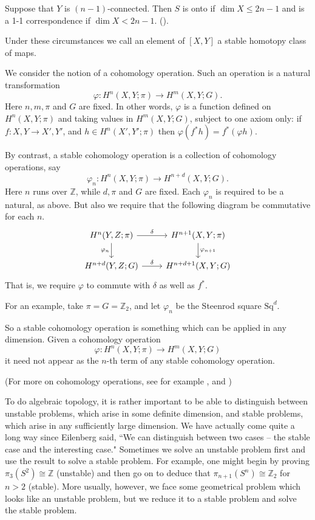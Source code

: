 \documentclass[../main]{subfiles}
\begin{document}
\begin{theorem}
    Suppose that $Y$ is $(n-1)$-connected. Then $S$ is onto if $\dim X \le 2n - 1$ and is a 1-1 correspondence if $\dim X < 2n - 1$. (\cite[p.~458]{spanier}).
\end{theorem}

Under these circumstances we call an element of $[X, Y]$ a stable homotopy class of maps.

\begin{example_different}
    We consider the notion of a cohomology operation. Such an operation is a natural transformation \[ \varphi \colon H^n(X, Y; \pi) \to H^m(X, Y; G). \] Here $n, m, \pi$ and $G$ are fixed. In other words, $\varphi$ is a function defined on $H^n(X, Y; \pi)$ and taking values in $H^m(X, Y; G)$, subject to one axiom only: if $f \colon X, Y \to X', Y'$, and $h \in H^n(X', Y'; \pi)$ then $\varphi(f^*h) = f^*(\varphi h)$.
\end{example_different}

By contrast, a stable cohomology operation is a collection of cohomology operations, say \[\varphi_n \colon H^n(X, Y; \pi) \to H^{n + d}(X, Y; G).\] Here $n$ runs over $\mathbb{Z}$, while $d, \pi$ and $G$ are fixed. Each $\varphi_n$ is required to be a natural, as above. But also we require that the following diagram be commutative for each $n$.
\[ 
\begin{tikzcd}
    H^n(Y, Z; \pi) \arrow[r, "\delta"] \arrow[d, "\varphi_n"'] & H^{n + 1}(X, Y; \pi) \arrow[d, "\varphi_{n + 1}"]\\ 
    H^{n + d}(Y, Z; G) \arrow[r, "\delta"] & H^{n + d + 1}(X, Y; G)
\end{tikzcd} 
\]
That is, we require $\varphi$ to commute with $\delta$ as well as $f^*$.

For an example, take $\pi = G = \mathbb Z_2$, and let $\varphi_n$ be the Steenrod square $\mathrm{Sq}^d$.

So a stable cohomology operation is something which can be applied in any dimension. Given a cohomology operation \[\varphi \colon H^n(X, Y; \pi) \to H^m(X, Y; G) \] it need not appear as the $n$-th term of any stable cohomology operation.

(For more on cohomology operations, see for example \cite{moshertangora},\cite{steenrodepstein} and \cite[p. 429-403]{spanier} )

To do algebraic topology, it is rather important to be able to distinguish between unstable problems, which arise in some definite dimension, and stable problems, which arise in any sufficiently large dimension. We have actually come quite a long way since Eilenberg said, ``We can distinguish between two cases -- the stable case and the interesting case." Sometimes we solve an unstable problem first and use the result to solve a stable problem. For example, one might begin by proving $\pi_3(S^2) \cong \mathbb{Z}$ (unstable) and then go on to deduce that $\pi_{n + 1}(S^n) \cong \mathbb{Z}_2$ for $n > 2$ (stable). More usually, however, we face some geometrical problem which looks like an unstable problem, but we reduce it to a stable problem and solve the stable problem.
\end{document}
